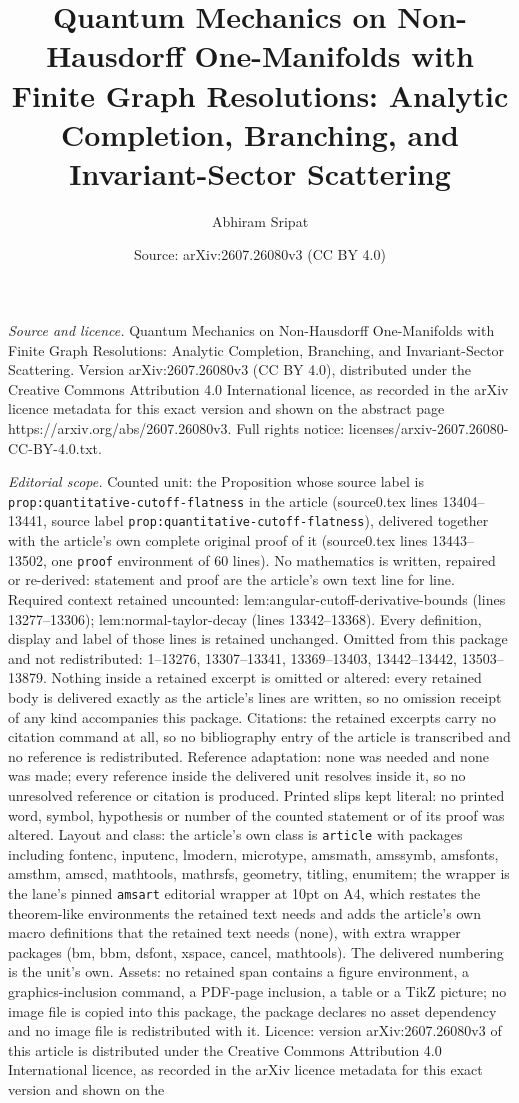 \documentclass[10pt,a4paper]{amsart}
\title[Quantum Mechanics on Non-Hausdorff One-Manifolds with Finite]{Quantum Mechanics on Non-Hausdorff One-Manifolds with Finite Graph Resolutions: Analytic Completion, Branching, and Invariant-Sector Scattering}
\author{Abhiram Sripat}
\date{Source: arXiv:2607.26080v3 (CC BY 4.0)}
\begin{document}
\maketitle

\noindent\emph{Source and licence.} Quantum Mechanics on Non-Hausdorff One-Manifolds with Finite Graph Resolutions: Analytic Completion, Branching, and Invariant-Sector Scattering. Version arXiv:2607.26080v3 (CC BY 4.0), distributed under the Creative Commons Attribution 4.0 International licence, as recorded in the arXiv licence metadata for this exact version and shown on the abstract page https://arxiv.org/abs/2607.26080v3. Full rights notice: licenses/arxiv-2607.26080-CC-BY-4.0.txt.\par\smallskip

\noindent\textit{Editorial scope.} Counted unit: the Proposition whose source label is \texttt{prop:quantitative-cutoff-flatness} in the article (source0.tex lines 13404--13441, source label \texttt{prop:quantitative-cutoff-flatness}), delivered together with the article's own complete original proof of it (source0.tex lines 13443--13502, one \texttt{proof} environment of 60 lines). No mathematics is written, repaired or re-derived: statement and proof are the article's own text line for line. Required context retained uncounted: lem:angular-cutoff-derivative-bounds (lines 13277--13306); lem:normal-taylor-decay (lines 13342--13368). Every definition, display and label of those lines is retained unchanged. Omitted from this package and not redistributed: 1--13276, 13307--13341, 13369--13403, 13442--13442, 13503--13879. Nothing inside a retained excerpt is omitted or altered: every retained body is delivered exactly as the article's lines are written, so no omission receipt of any kind accompanies this package. Citations: the retained excerpts carry no citation command at all, so no bibliography entry of the article is transcribed and no reference is redistributed. Reference adaptation: none was needed and none was made; every reference inside the delivered unit resolves inside it, so no unresolved reference or citation is produced. Printed slips kept literal: no printed word, symbol, hypothesis or number of the counted statement or of its proof was altered. Layout and class: the article's own class is \texttt{article} with packages including fontenc, inputenc, lmodern, microtype, amsmath, amssymb, amsfonts, amsthm, amscd, mathtools, mathrsfs, geometry, titling, enumitem; the wrapper is the lane's pinned \texttt{amsart} editorial wrapper at 10pt on A4, which restates the theorem-like environments the retained text needs and adds the article's own macro definitions that the retained text needs (none), with extra wrapper packages (bm, bbm, dsfont, xspace, cancel, mathtools). The delivered numbering is the unit's own. Assets: no retained span contains a figure environment, a graphics-inclusion command, a PDF-page inclusion, a table or a TikZ picture; no image file is copied into this package, the package declares no asset dependency and no image file is redistributed with it. Licence: version arXiv:2607.26080v3 of this article is distributed under the Creative Commons Attribution 4.0 International licence, as recorded in the arXiv licence metadata for this exact version and shown on the 
\end{document}
